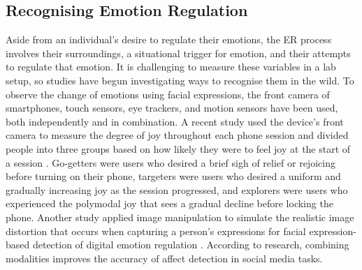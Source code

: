 \documentclass[lettersize,journal]{IEEEtran}
\begin{document}
\subsection{Recognising Emotion Regulation}
Aside from an individual's desire to regulate their emotions, the ER process involves their surroundings, a situational trigger for emotion, and their attempts to regulate that emotion. It is challenging to measure these variables in a lab setup, so studies have begun investigating ways to recognise them in the wild. To observe the change of emotions using facial expressions, the front camera of smartphones, touch sensors, eye trackers, and motion sensors have been used, both independently and in combination. A recent study used the device's front camera to measure the degree of joy throughout each phone session and divided people into three groups based on how likely they were to feel joy at the start of a session \cite{tag2022emotion}. Go-getters were users who desired a brief sigh of relief or rejoicing before turning on their phone, targeters were users who desired a uniform and gradually increasing joy as the session progressed, and explorers were users who experienced the polymodal joy that sees a gradual decline before locking the phone. Another study applied image manipulation to simulate the realistic image distortion that occurs when capturing a person's expressions for facial expression-based detection of digital emotion regulation \cite{yang2021benchmarking}. According to research, combining modalities improves the accuracy of affect detection in social media tasks.
\end{document}
